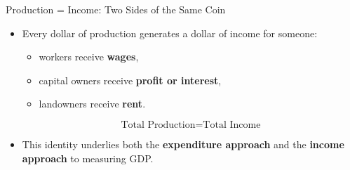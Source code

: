 \documentclass[aspectratio=169]{beamer}
\begin{document}
\begin{frame}{Production = Income: Two Sides of the Same Coin}
\transfade
\begin{itemize}
  \item Every dollar of production generates a dollar of \alert{income} for someone:
  \begin{itemize}
    \item workers receive \textbf{wages},
    \item capital owners receive \textbf{profit or interest},
    \item landowners receive \textbf{rent}.
  \end{itemize}
  \[
    \text{Total Production} = \text{Total Income}
  \]
  \item This identity underlies both the \textbf{expenditure approach} and the \textbf{income approach} to measuring GDP.
\end{itemize}
\end{frame}
\end{document}
